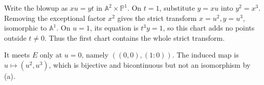Write the blowup as $xu=yt$ in $\mathbb A^2\times\mathbb P^1$. On $t=1$, substitute $y=xu$ into $y^2=x^3$. Removing the exceptional factor $x^2$ gives the strict transform $x=u^2,y=u^3$, isomorphic to $\mathbb A^1$. On $u=1$, its equation is $t^3y=1$, so this chart adds no points outside $t\ne0$. Thus the first chart contains the whole strict transform.

It meets $E$ only at $u=0$, namely $((0,0),(1:0))$. The induced map is $u\mapsto(u^2,u^3)$, which is bijective and bicontinuous but not an isomorphism by (a).
